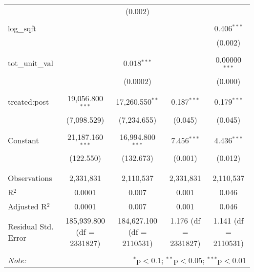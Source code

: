 \begin{table}[H]
{\begin{tabular}{@{\extracolsep{5pt}}lcccc}
   &  & (0.002) &  &  \\  

   & & & & \\  

  log\_sqft &  &  &  & 0.406$^{***}$ \\  

   &  &  &  & (0.002) \\  

   & & & & \\  

  tot\_unit\_val &  & 0.018$^{***}$ &  & 0.00000$^{***}$ \\  

   &  & (0.0002) &  & (0.000) \\  

   & & & & \\  

  treated:post & 19,056.800$^{***}$ & 17,260.550$^{**}$ & 0.187$^{***}$ & 0.179$^{***}$ \\  

   & (7,098.529) & (7,234.655) & (0.045) & (0.045) \\  

   & & & & \\  

  Constant & 21,187.160$^{***}$ & 16,994.800$^{***}$ & 7.456$^{***}$ & 4.436$^{***}$ \\  

   & (122.550) & (132.673) & (0.001) & (0.012) \\  

   & & & & \\  

 \hline \\[-1.8ex]  

 Observations & 2,331,831 & 2,110,537 & 2,331,831 & 2,110,537 \\  

 R$^{2}$ & 0.0001 & 0.007 & 0.001 & 0.046 \\  

 Adjusted R$^{2}$ & 0.0001 & 0.007 & 0.001 & 0.046 \\  

 Residual Std. Error & 185,939.800 (df = 2331827) & 184,627.100 (df = 2110531) & 1.176 (df = 2331827) & 1.141 (df = 2110531) \\  

 \hline  

 \hline \\[-1.8ex]  

 \textit{Note:}  & \multicolumn{4}{r}{$^{*}$p$<$0.1; $^{**}$p$<$0.05; $^{***}$p$<$0.01} \\  

 \end{tabular}}  

 \end{table}  

